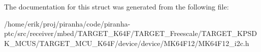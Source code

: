 The documentation for this struct was generated from the following file\+:\begin{DoxyCompactItemize}
\item 
/home/erik/proj/piranha/code/piranha-\/ptc/src/receiver/mbed/\+T\+A\+R\+G\+E\+T\+\_\+\+K64\+F/\+T\+A\+R\+G\+E\+T\+\_\+\+Freescale/\+T\+A\+R\+G\+E\+T\+\_\+\+K\+P\+S\+D\+K\+\_\+\+M\+C\+U\+S/\+T\+A\+R\+G\+E\+T\+\_\+\+M\+C\+U\+\_\+\+K64\+F/device/device/\+M\+K64\+F12/M\+K64\+F12\+\_\+i2c.\+h\end{DoxyCompactItemize}
